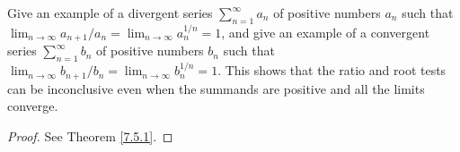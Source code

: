 \begin{exercise}\label{ex 7.5.3}
    Give an example of a divergent series \(\sum_{n = 1}^\infty a_n\) of positive numbers \(a_n\) such that \(\lim_{n \to \infty} a_{n + 1} / a_n = \lim_{n \to \infty} a_n^{1 / n} = 1\), and give an example of a convergent series \(\sum_{n = 1}^\infty b_n\) of positive numbers \(b_n\) such that \(\lim_{n \to \infty} b_{n + 1} / b_n = \lim_{n \to \infty} b_n^{1 / n} = 1\).
    This shows that the ratio and root tests can be inconclusive even when the summands are positive and all the limits converge.
\end{exercise}

\begin{proof}
    See Theorem \ref{7.5.1}.
\end{proof}